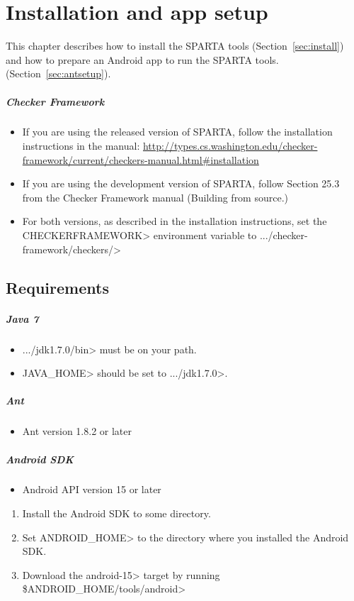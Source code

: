 \htmlhr
\chapter{Installation and app setup\label{installation}}
This chapter describes how to install the SPARTA tools
(Section~\ref{sec:install}) and how to prepare an Android app to run the
SPARTA tools. (Section~\ref{sec:antsetup}).

\paragraph{Checker Framework}
\begin{itemize}
\item If you are using the released version of SPARTA, follow the installation instructions in the manual: 
\url{http://types.cs.washington.edu/checker-framework/current/checkers-manual.html#installation}
\item If you are using the development version of SPARTA,  follow Section 25.3 from the Checker Framework manual (Building from source.)
\item  For both versions, as described in the installation instructions, set the \<CHECKERFRAMEWORK>
  environment variable to \<.../checker-framework/checkers/>
\end{itemize}

\section {Requirements\label{sec:requirements}}
\paragraph{Java 7}
\begin{itemize}
 \item  \<.../jdk1.7.0/bin> must be on your path.
 \item \<JAVA\_HOME> should be set to \<.../jdk1.7.0>.
\end{itemize}

\paragraph{Ant}
\begin{itemize}
 \item Ant version 1.8.2 or later
\end{itemize}

\paragraph{Android SDK}
\begin{itemize}
 \item Android API version 15 or later
\end{itemize}
\begin{enumerate}
 \item Install the Android SDK to some directory. 
 \item Set \<ANDROID\_HOME> to the directory where you installed the
   Android SDK.
 \item Download the \<android-15> target by running \<\$ANDROID\_HOME/tools/android>
\end{enumerate}

